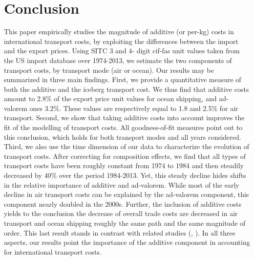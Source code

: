 \documentclass[a4paper,11pt]{article}
\begin{document}



\section{Conclusion \label{sec:conclu}}

This paper empirically studies the magnitude of additive (or per-kg) costs in international transport costs, by exploiting the differences between the import and the export prices. Using SITC 3 and 4- digit cif-fas unit values taken from the US import database over 1974-2013, we estimate the two components of transport costs, by transport mode (air or ocean).  Our results may be summarized in three main findings. First, we provide a quantitative measure of both the additive and the iceberg transport cost. We thus find that additive costs amount to 2.8\% of the export price unit values for ocean shipping, and ad-valorem ones 3.2\%. These values are respectively equal to 1.8 and 2.5\% for air transport. Second, we show that taking additive costs into account improves the fit of the modelling of transport costs. All goodness-of-fit measures point out to this conclusion, which holds for both transport modes and all years considered. Third, we also use the time dimension of our data to characterize the evolution of transport costs. After correcting for composition effects, we find that all types of transport costs have been roughly constant from 1974 to 1984 and then steadily decreased by 40\% over the period 1984-2013. Yet, this steady decline hides shifts in the relative importance of additive and ad-valorem. While most of the early decline in air transport costs can be explained by the ad-valorem component, this component nearly doubled in the 2000s. Further, the inclusion of additive costs yields to the conclusion the decrease of overall trade costs are decreased in air transport and ocean shipping roughly the same path and the same magnitude of order. This last result stands in contrast with related studies (\citealp{hummels2007}, \citealp{Behar_Venables}). In all three aspects, our results point the importance of the additive component in accounting for international transport costs.
\end{document}
